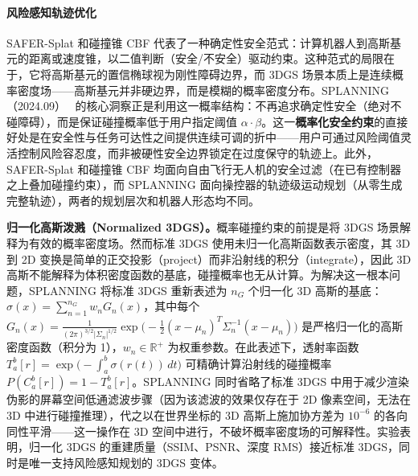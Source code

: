 \paragraph{风险感知轨迹优化}

SAFER-Splat 和碰撞锥 CBF 代表了一种确定性安全范式：计算机器人到高斯基元的距离或速度锥，以二值判断（安全/不安全）驱动约束。这种范式的局限在于，它将高斯基元的置信椭球视为刚性障碍边界，而 3DGS 场景本质上是连续概率密度场——高斯基元并非硬边界，而是模糊的概率密度分布。SPLANNING（2024.09）~\cite{2409_16915} 的核心洞察正是利用这一概率结构：不再追求确定性安全（绝对不碰障碍），而是保证碰撞概率低于用户指定阈值 $\alpha \cdot \beta$。这一\textbf{概率化安全约束}的直接好处是在安全性与任务可达性之间提供连续可调的折中——用户可通过风险阈值灵活控制风险容忍度，而非被硬性安全边界锁定在过度保守的轨迹上。此外，SAFER-Splat 和碰撞锥 CBF 均面向自由飞行无人机的安全过滤（在已有控制器之上叠加碰撞约束），而 SPLANNING 面向操控器的轨迹级运动规划（从零生成完整轨迹），两者的规划层次和机器人形态均不同。

\textbf{归一化高斯泼溅（Normalized 3DGS）。}概率碰撞约束的前提是将 3DGS 场景解释为有效的概率密度场。然而标准 3DGS 使用未归一化高斯函数表示密度，其 3D 到 2D 变换是简单的正交投影（project）而非沿射线的积分（integrate），因此 3D 高斯不能解释为体积密度函数的基底，碰撞概率也无从计算。为解决这一根本问题，SPLANNING 将标准 3DGS 重新表述为 $n_G$ 个归一化 3D 高斯的基底：$\sigma(x) = \sum_{n=1}^{n_G} w_n G_n(x)$，其中每个 $G_n(x) = \frac{1}{(2\pi)^{3/2}|\Sigma_n|^{1/2}} \exp\!\bigl(-\frac{1}{2}(x - \mu_n)^T \Sigma_n^{-1}(x - \mu_n)\bigr)$ 是严格归一化的高斯密度函数（积分为 1），$w_n \in \mathbb{R}^+$ 为权重参数。在此表述下，透射率函数 $T_a^b[r] = \exp\!\bigl(-\int_a^b \sigma(r(t))\, dt\bigr)$ 可精确计算沿射线的碰撞概率 $P(C_a^b[r]) = 1 - T_a^b[r]$。SPLANNING 同时省略了标准 3DGS 中用于减少渲染伪影的屏幕空间低通滤波步骤（因为该滤波的效果仅存在于 2D 像素空间，无法在 3D 中进行碰撞推理），代之以在世界坐标的 3D 高斯上施加协方差为 $10^{-6}$ 的各向同性平滑——这一操作在 3D 空间中进行，不破坏概率密度场的可解释性。实验表明，归一化 3DGS 的重建质量（SSIM、PSNR、深度 RMS）接近标准 3DGS，同时是唯一支持风险感知规划的 3DGS 变体。

